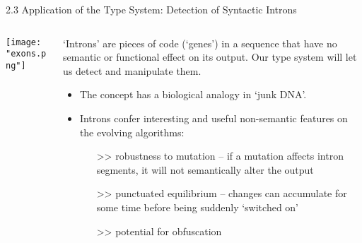 \documentclass[9pt]{beamer}
\begin{document}
\begin{frame}{2.3 Application of the Type System: Detection of Syntactic Introns}

\begin{columns}

\begin{column}{.5\textwidth}
\texttt{[image: "exons.png"]}
\end{column}

\begin{column}{.5\textwidth}


`Introns' are pieces of code (`genes') in a sequence that have no semantic or functional effect on its output. Our type system will let us detect and manipulate them.

\begin{itemize}

\item The concept has a biological analogy in `junk DNA'. 

\item Introns confer interesting and useful non-semantic features on the evolving algorithms:

\begin{itemize}
\item[>>] robustness to mutation -- if a mutation affects intron segments, it will not semantically alter the output
\item[>>] punctuated equilibrium -- changes can accumulate for some time before being suddenly `switched on'
\item[>>] potential for obfuscation
\end{itemize}
\end{itemize}
\end{column}

\end{columns}


\end{frame}
\end{document}
